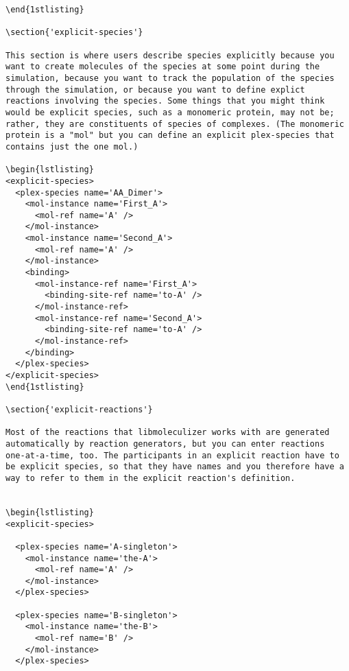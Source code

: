 \begin{lstlisting}
\end{1stlisting}

\section{'explicit-species'}

This section is where users describe species explicitly because you
want to create molecules of the species at some point during the
simulation, because you want to track the population of the species
through the simulation, or because you want to define explict
reactions involving the species. Some things that you might think
would be explicit species, such as a monomeric protein, may not be;
rather, they are constituents of species of complexes. (The monomeric
protein is a "mol" but you can define an explicit plex-species that
contains just the one mol.)

\begin{lstlisting}
<explicit-species>
  <plex-species name='AA_Dimer'>
    <mol-instance name='First_A'>
      <mol-ref name='A' />
    </mol-instance>
    <mol-instance name='Second_A'>
      <mol-ref name='A' />
    </mol-instance>
    <binding>
      <mol-instance-ref name='First_A'>
        <binding-site-ref name='to-A' />
      </mol-instance-ref>
      <mol-instance-ref name='Second_A'>
        <binding-site-ref name='to-A' />
      </mol-instance-ref>
    </binding>
  </plex-species>
</explicit-species>
\end{1stlisting}

\section{'explicit-reactions'}

Most of the reactions that libmoleculizer works with are generated
automatically by reaction generators, but you can enter reactions
one-at-a-time, too. The participants in an explicit reaction have to
be explicit species, so that they have names and you therefore have a
way to refer to them in the explicit reaction's definition. 


\begin{lstlisting}
<explicit-species>

  <plex-species name='A-singleton'>
    <mol-instance name='the-A'>
      <mol-ref name='A' />
    </mol-instance>
  </plex-species>

  <plex-species name='B-singleton'>
    <mol-instance name='the-B'>
      <mol-ref name='B' />
    </mol-instance>
  </plex-species>


\end{lstlisting}
